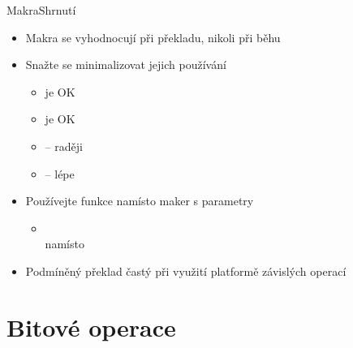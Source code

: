 \begin{frame}{Makra}{Shrnutí}

  \begin{itemize}
    \item Makra se vyhodnocují při překladu, nikoli při běhu
    \item Snažte se minimalizovat jejich používání
    \begin{itemize}
      \item {} je OK
      \item {} je OK

      \pause

      \item {} -- raději 

      \pause

      \item {} -- lépe 
    \end{itemize}

    \pause

    \item Používejte  funkce namísto maker s parametry
    \begin{itemize}
      \item {} \\
        namísto \\
    \end{itemize}

    \pause

    \item Podmíněný překlad častý při využití platformě závislých operací

  \end{itemize}

\end{frame}

\fi

\section{Bitové operace}
\frame{\sectionpage}

